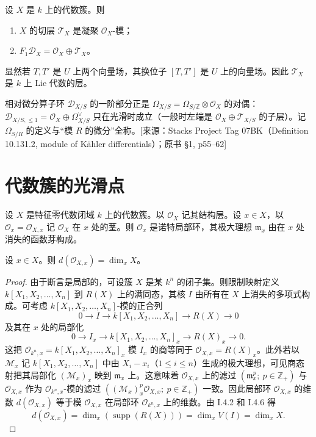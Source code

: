\begin{proposition}
设 $X$ 是 $k$ 上的代数簇。则
\begin{enumerate}[label=(\roman*)]
  \item $X$ 的切层 $\mathcal{T}_X$ 是凝聚 $\mathcal{O}_X$-模；
  \item $F_1\mathcal{D}_X=\mathcal{O}_X\oplus\mathcal{T}_X$。
\end{enumerate}
\end{proposition}

显然若 $T,T'$ 是 $U$ 上两个向量场，其换位子 $[T,T']$ 是 $U$ 上的向量场。因此 $\mathcal{T}_X$ 是 $k$ 上 Lie 代数的层。
\begin{annote}
相对微分算子环 $\mathcal D_{X/S}$ 的一阶部分正是 $\Omega_{X/S}=\Omega_{S/\mathbb Z}\otimes\mathcal O_X$ 的对偶：$\mathcal D_{X/S,\le1}=\mathcal O_X\oplus\Omega_{X/S}^{\vee}$ 只在光滑时成立（一般时左端是 $\mathcal O_X\oplus\mathcal T_{X/S}$ 的子层）。记 $\Omega_{S/R}$ 的定义与“模 $R$ 的微分”全称。[来源：Stacks Project Tag 07BK（Definition 10.131.2, module of Kähler differentials）；原书 §1, p55–62]
\end{annote}



\section{代数簇的光滑点}

设 $X$ 是特征零代数闭域 $k$ 上的代数簇。以 $\mathcal{O}_X$ 记其结构层。设 $x\in X$，以 $\mathcal{O}_x=\mathcal{O}_{X,x}$ 记 $\mathcal{O}_X$ 在 $x$ 处的茎。则 $\mathcal{O}_x$ 是诺特局部环，其极大理想 $\mathfrak{m}_x$ 由在 $x$ 处消失的函数芽构成。

\begin{lemma}
设 $x\in X$。则 $d(\mathcal{O}_{X,x})=\dim_x X$。
\end{lemma}

\begin{proof}
由于断言是局部的，可设簇 $X$ 是某 $k^n$ 的闭子集。则限制映射定义 $k[X_1,X_2,\dots,X_n]$ 到 $R(X)$ 上的满同态，其核 $I$ 由所有在 $X$ 上消失的多项式构成。可考虑 $k[X_1,X_2,\dots,X_n]$-模的正合列
$$0\longrightarrow I\longrightarrow k[X_1,X_2,\dots,X_n]\longrightarrow R(X)\longrightarrow 0$$
及其在 $x$ 处的局部化
$$0\longrightarrow I_x\longrightarrow k[X_1,X_2,\dots,X_n]_x\longrightarrow R(X)_x\longrightarrow 0.$$
这把 $\mathcal{O}_{k^n,x}=k[X_1,X_2,\dots,X_n]_x$ 模 $I_x$ 的商等同于 $\mathcal{O}_{X,x}=R(X)_x$。此外若以 $\mathcal{M}_x$ 记 $k[X_1,X_2,\dots,X_n]$ 中由 $X_i-x_i$（$1\le i\le n$）生成的极大理想，可见商态射把其局部化 $(\mathcal{M}_x)_x$ 映到 $\mathfrak{m}_x$ 上。这意味着 $\mathcal{O}_{X,x}$ 上的滤过 $(\mathfrak{m}_x^p;\ p\in\mathbb{Z}_+)$ 与 $\mathcal{O}_{X,x}$ 作为 $\mathcal{O}_{k^n,x}$-模的滤过 $((\mathcal{M}_x)^p_x\mathcal{O}_{X,x};\ p\in\mathbb{Z}_+)$ 一致。因此局部环 $\mathcal{O}_{X,x}$ 的维数 $d(\mathcal{O}_{X,x})$ 等于模 $\mathcal{O}_{X,x}$ 在局部环 $\mathcal{O}_{k^n,x}$ 上的维数。由 I.4.2 和 I.4.6 得
$$d(\mathcal{O}_{X,x})=\dim_x(\operatorname{supp}(R(X)))=\dim_x V(I)=\dim_x X.$$
\end{proof}

